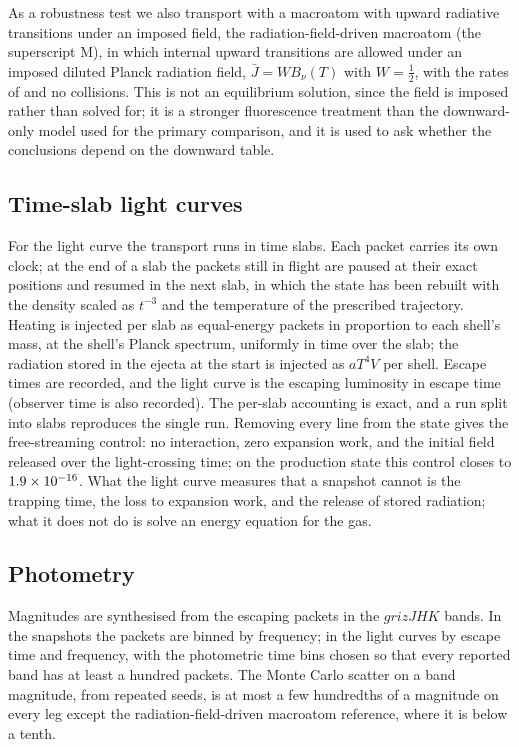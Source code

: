 \documentclass[fleqn,usenatbib]{mnras}
\begin{document}
As a robustness test we also transport with a macroatom with upward radiative transitions under an imposed field, the radiation-field-driven macroatom (the superscript M), in which internal upward transitions are allowed under an imposed diluted Planck radiation field, $\bar J=W B_\nu(T)$ with $W=\tfrac12$, with the rates of \citet{lucy2003} and no collisions. This is not an equilibrium solution, since the field is imposed rather than solved for; it is a stronger fluorescence treatment than the downward-only model used for the primary comparison, and it is used to ask whether the conclusions depend on the downward table.

\subsection{Time-slab light curves}

For the light curve the transport runs in time slabs. Each packet carries its own clock; at the end of a slab the packets still in flight are paused at their exact positions and resumed in the next slab, in which the state has been rebuilt with the density scaled as $t^{-3}$ and the temperature of the prescribed trajectory. Heating is injected per slab as equal-energy packets in proportion to each shell's mass, at the shell's Planck spectrum, uniformly in time over the slab; the radiation stored in the ejecta at the start is injected as $aT^4V$ per shell. Escape times are recorded, and the light curve is the escaping luminosity in escape time (observer time is also recorded). The per-slab accounting is exact, and a run split into slabs reproduces the single run. Removing every line from the state gives the free-streaming control: no interaction, zero expansion work, and the initial field released over the light-crossing time; on the production state this control closes to $1.9 \times 10^{-16}$. What the light curve measures that a snapshot cannot is the trapping time, the loss to expansion work, and the release of stored radiation; what it does not do is solve an energy equation for the gas.

\subsection{Photometry}

Magnitudes are synthesised from the escaping packets in the $grizJHK$ bands. In the snapshots the packets are binned by frequency; in the light curves by escape time and frequency, with the photometric time bins chosen so that every reported band has at least a hundred packets. The Monte Carlo scatter on a band magnitude, from repeated seeds, is at most a few hundredths of a magnitude on every leg except the radiation-field-driven macroatom reference, where it is below a tenth.
\end{document}
